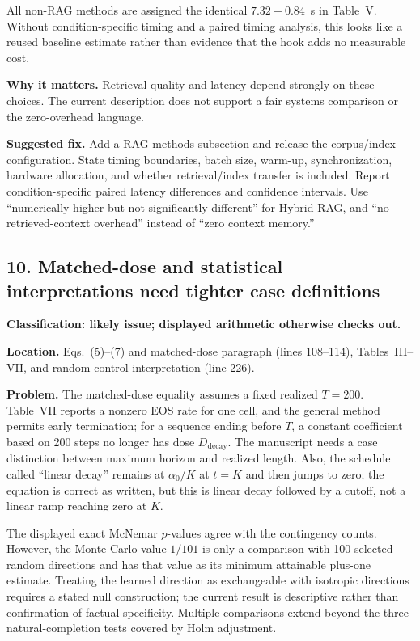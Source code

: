 \documentclass[11pt]{article}
\newcommand{\status}[1]{\textbf{#1}}
\begin{document}
All non-RAG methods are assigned the identical $7.32\pm0.84$~s in Table~V.  Without condition-specific timing and a paired timing analysis, this looks like a reused baseline estimate rather than evidence that the hook adds no measurable cost.

\status{Why it matters.} Retrieval quality and latency depend strongly on these choices.  The current description does not support a fair systems comparison or the zero-overhead language.

\status{Suggested fix.} Add a RAG methods subsection and release the corpus/index configuration.  State timing boundaries, batch size, warm-up, synchronization, hardware allocation, and whether retrieval/index transfer is included.  Report condition-specific paired latency differences and confidence intervals.  Use ``numerically higher but not significantly different'' for Hybrid RAG, and ``no retrieved-context overhead'' instead of ``zero context memory.''

\subsection*{10. Matched-dose and statistical interpretations need tighter case definitions}

\status{Classification: likely issue; displayed arithmetic otherwise checks out.}

\status{Location.} Eqs.~(5)--(7) and matched-dose paragraph (lines 108--114), Tables~III--VII, and random-control interpretation (line 226).

\status{Problem.} The matched-dose equality assumes a fixed realized $T=200$.  Table~VII reports a nonzero EOS rate for one cell, and the general method permits early termination; for a sequence ending before $T$, a constant coefficient based on 200 steps no longer has dose $D_{\mathrm{decay}}$.  The manuscript needs a case distinction between maximum horizon and realized length.  Also, the schedule called ``linear decay'' remains at $\alpha_0/K$ at $t=K$ and then jumps to zero; the equation is correct as written, but this is linear decay followed by a cutoff, not a linear ramp reaching zero at $K$.

The displayed exact McNemar $p$-values agree with the contingency counts.  However, the Monte Carlo value $1/101$ is only a comparison with 100 selected random directions and has that value as its minimum attainable plus-one estimate.  Treating the learned direction as exchangeable with isotropic directions requires a stated null construction; the current result is descriptive rather than confirmation of factual specificity.  Multiple comparisons extend beyond the three natural-completion tests covered by Holm adjustment.
\end{document}
